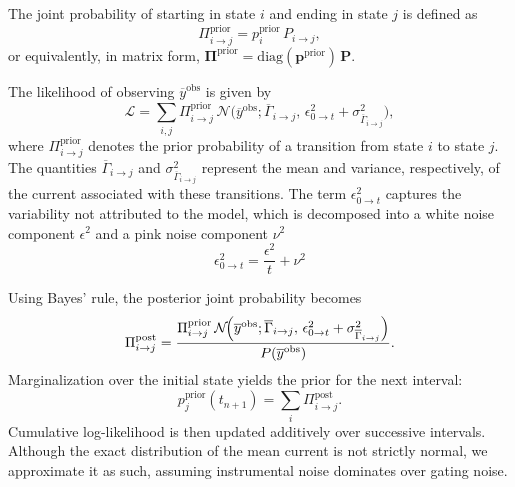 \documentclass[9pt]{elife}
\begin{document}
	The joint probability of starting in state \(i\) and ending in state \(j\) is defined as
	\begin{equation}
		\Pi_{i\rightarrow j}^{\text{prior}} = p_i^{\text{prior}}\,P_{i\rightarrow j},
		\label{eq:joint_state_probability_short}
	\end{equation}
	or equivalently, in matrix form, \(\boldsymbol{\Pi}^{\text{prior}} = \mathrm{diag}(\boldsymbol{p}^{\text{prior}})\,\mathbf{P}\).
	
	The likelihood of observing $\overline{y}^{\text{obs}}$ is given by
	\begin{equation}
		\mathcal{L} = \sum_{i,j} \Pi_{i\rightarrow j}^{\text{prior}}\,\mathcal{N}\!\Biggl(
		\overline{y}^{\text{obs}}; \overline{\Gamma}_{i\rightarrow j}, \,
		\epsilon ^2_{0 \rightarrow t}  + \sigma^2_{\overline{\Gamma}_{i\rightarrow j}}
		\Biggr),
		\label{eq:integrated_likelihood_short}
	\end{equation}
	where $\Pi_{i\rightarrow j}^{\text{prior}}$ denotes the prior probability of a transition from state $i$ to state $j$. The quantities $\overline{\Gamma}_{i\rightarrow j}$ and $\sigma^2_{\overline{\Gamma}_{i\rightarrow j}}$ represent the mean and variance, respectively, of the current associated with these transitions. The term $\epsilon ^2_{0 \rightarrow t}$ captures the variability not attributed to the model, which is decomposed into a white noise component $\epsilon^2$ and a pink noise component $\nu^2$ 
	\begin{equation}
		\epsilon ^2_{0 \rightarrow t} = \frac{\epsilon^2}{t} + \nu ^2
		\label{eq:interval_noise}
	\end{equation}
	
	
	Using Bayes' rule, the posterior joint probability becomes
	\begin{equation}
		\Pi_{i\rightarrow j}^{\text{post}} = \frac{\Pi_{i\rightarrow j}^{\text{prior}}\,\mathcal{N}\!\Bigl(\overline{y}^{\text{obs}}; \overline{\Gamma}_{i\rightarrow j},\, \epsilon ^2_{0 \rightarrow t} + \sigma^2_{\overline{\Gamma}_{i\rightarrow j}}\Bigr)}{P(\overline{y}^{\text{obs}})}.
		\label{eq:integrated_posterior_short}
	\end{equation}
	Marginalization over the initial state yields the prior for the next interval:
	\begin{equation}
		p_j^{\text{prior}}(t_{n+1}) = \sum_i \Pi_{i\rightarrow j}^{\text{post}}.
		\label{eq:next_prior_short}
	\end{equation}
	Cumulative log-likelihood is then updated additively over successive intervals. Although the exact distribution of the mean current is not strictly normal, we approximate it as such, assuming instrumental noise dominates over gating noise.
	
\end{document}
